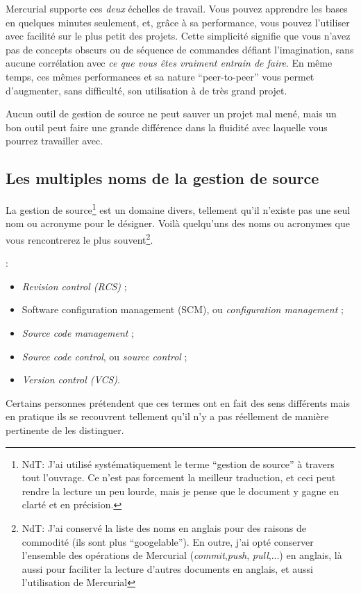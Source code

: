 Mercurial supporte ces \emph{deux} échelles de travail. Vous pouvez apprendre
les bases en quelques minutes seulement, et, grâce à sa performance, vous pouvez
l'utiliser avec facilité sur le plus petit des projets. Cette simplicité 
signifie que vous n'avez pas de concepts obscurs ou de séquence de commandes
défiant l'imagination, sans aucune corrélation avec \emph{ce que vous êtes 
vraiment entrain de faire}. En même temps, ces mêmes performances et sa 
nature ``peer-to-peer'' vous permet d'augmenter, sans difficulté, son 
utilisation à de très grand projet.

Aucun outil de gestion de source ne peut sauver un projet mal mené, mais un
bon outil peut faire une grande différence dans la fluidité avec laquelle
vous pourrez travailler avec.

\subsection{Les multiples noms de la gestion de source}

La gestion de source\footnote{NdT: J'ai utilisé systématiquement le terme
``gestion de source'' à travers tout l'ouvrage. Ce n'est pas forcement la
meilleur traduction, et ceci peut rendre la lecture un peu lourde, mais je
pense que le document y gagne en clarté et en précision.} est un domaine
divers, tellement qu'il n'existe pas une seul nom ou acronyme pour le désigner.
Voilà quelqu'uns des noms ou 
acronymes que vous rencontrerez le plus souvent\footnote{NdT: J'ai conservé la
liste des noms en anglais pour des raisons de commodité (ils sont plus
``googelable''). En outre, j'ai opté  conserver l'ensemble des opérations de
Mercurial (\textit{commit},\textit{push}, \textit{pull},...) en anglais, là
aussi pour faciliter la lecture d'autres documents en anglais, et aussi
l'utilisation de Mercurial}.

:
\begin{itemize}
\item \textit{Revision control (RCS)} ;
\item Software configuration management (SCM), ou \textit{configuration management} ;
\item \textit{Source code management} ;
\item \textit{Source code control}, ou \textit{source control} ;
\item \textit{Version control (VCS)}.
\end{itemize}

Certains personnes prétendent que ces termes ont en fait des sens
différents mais en pratique ils se recouvrent tellement qu'il n'y a pas
réellement de manière pertinente de les distinguer.

